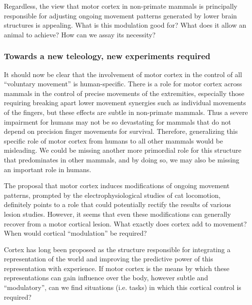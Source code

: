 Regardless, the view that motor cortex in non-primate mammals is principally responsible for adjusting ongoing movement patterns generated by lower brain structures is appealing. What is this modulation good for? What does it allow an animal to achieve? How can we assay its necessity?

\subsubsection*{Towards a new teleology, new experiments required}

It should now be clear that the involvement of motor cortex in the control of all ``voluntary movement'' is human-specific. There is a role for motor cortex across mammals in the control of precise movements of the extremities, especially those requiring breaking apart lower movement synergies such as individual movements of the fingers, but these effects are subtle in non-primate mammals. Thus a severe impairment for humans may not be so devastating for mammals that do not depend on precision finger movements for survival. Therefore, generalizing this specific role of motor cortex from humans to all other mammals would be misleading. We could be missing another more primordial role for this structure that predominates in other mammals, and by doing so, we may also be missing an important role in humans.

The proposal that motor cortex induces modifications of ongoing movement patterns, prompted by the electrophysiological studies of cat locomotion, definitely points to a role that could potentially rectify the results of various lesion studies. However, it seems that even these modifications can generally recover from a motor cortical lesion. What exactly does cortex add to movement? When would cortical ``modulation'' be required?

Cortex has long been proposed as the structure responsible for integrating a representation of the world and improving the predictive power of this representation with experience. If motor cortex is the means by which these representations can gain influence over the body, however subtle and ``modulatory'', can we find situations (i.e. tasks) in which this cortical control is required?


